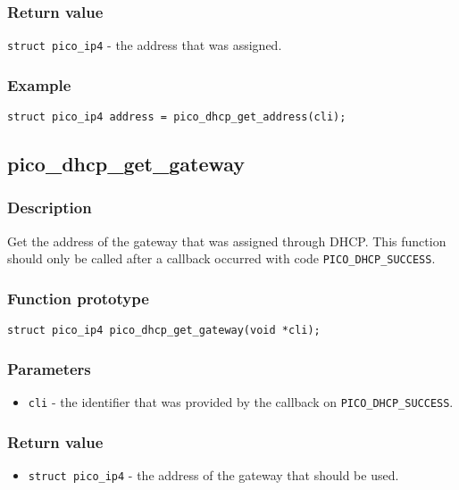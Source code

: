 \subsubsection*{Return value}
\texttt{struct pico\_ip4} - the address that was assigned.


\subsubsection*{Example}
\begin{verbatim}
struct pico_ip4 address = pico_dhcp_get_address(cli);
\end{verbatim}


\subsection{pico\_dhcp\_get\_gateway}

\subsubsection*{Description}
Get the address of the gateway that was assigned through DHCP. This function should
only be called after a callback occurred with code \texttt{PICO\_DHCP\_SUCCESS}. 

\subsubsection*{Function prototype}
\texttt{struct pico\_ip4 pico\_dhcp\_get\_gateway(void *cli);}

\subsubsection*{Parameters}
\begin{itemize}[noitemsep]
\item \texttt{cli} - the identifier that was provided by the callback on \texttt{PICO\_DHCP\_SUCCESS}.
\end{itemize}

\subsubsection*{Return value}
\begin{itemize}[noitemsep]
\item \texttt{struct pico\_ip4} - the address of the gateway that should be used. 
\end{itemize}

